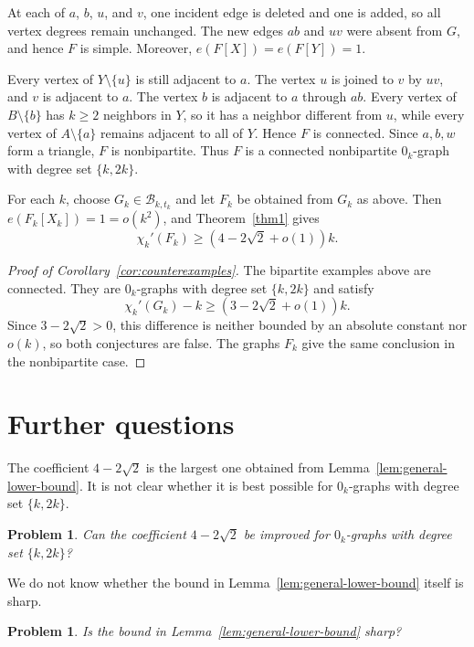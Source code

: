 \documentclass[11pt]{article}
\newtheorem{problem}[theorem]{Problem}
\newcommand{\chik}{\chi_k'}
\begin{document}
At each of $a$, $b$, $u$, and $v$, one incident edge is deleted and
one is added, so all vertex degrees remain unchanged. The new edges
$ab$ and $uv$ were absent from $G$, and hence $F$ is simple. Moreover,
$e(F[X])=e(F[Y])=1$.

Every vertex of $Y\setminus\{u\}$ is still adjacent to $a$. The vertex
$u$ is joined to $v$ by $uv$, and $v$ is adjacent to $a$. The vertex
$b$ is adjacent to $a$ through $ab$. Every vertex of
$B\setminus\{b\}$ has $k\geq2$ neighbors in $Y$, so it has a neighbor
different from $u$, while every vertex of $A\setminus\{a\}$ remains
adjacent to all of $Y$. Hence $F$ is connected. Since $a,b,w$ form a
triangle, $F$ is nonbipartite. Thus $F$ is a connected nonbipartite
$0_k$-graph with degree set $\{k,2k\}$.


For each $k$, choose $G_k\in\mathcal B_{k,t_k}$ and let $F_k$ be
obtained from $G_k$ as above. Then
$e(F_k[X_k])=1=o(k^2)$, and Theorem~\ref{thm1} gives
\[
\chik(F_k)\geq(4-2\sqrt2+o(1))k.
\]

\begin{proof}[Proof of Corollary~\ref{cor:counterexamples}]
The bipartite examples above are connected. They are $0_k$-graphs with
degree set $\{k,2k\}$ and satisfy
\[
\chik(G_k)-k\geq(3-2\sqrt2+o(1))k.
\]
Since $3-2\sqrt2>0$, this difference is neither bounded by an absolute
constant nor $o(k)$, so both conjectures are false. The graphs $F_k$
give the same conclusion in the nonbipartite case.
\end{proof}

\section{Further questions}\label{sec:consequences}

The coefficient $4-2\sqrt2$ is the largest one obtained from
Lemma~\ref{lem:general-lower-bound}. It is not clear whether it is
best possible for $0_k$-graphs with degree set $\{k,2k\}$.

\begin{problem}\label{prob:degree-set}
Can the coefficient $4-2\sqrt2$ be improved for $0_k$-graphs with
degree set $\{k,2k\}$?
\end{problem}

We do not know whether the bound in
Lemma~\ref{lem:general-lower-bound} itself is sharp.

\begin{problem}\label{prob:lemma-sharp}
Is the bound in Lemma~\ref{lem:general-lower-bound} sharp?
\end{problem}
\end{document}
